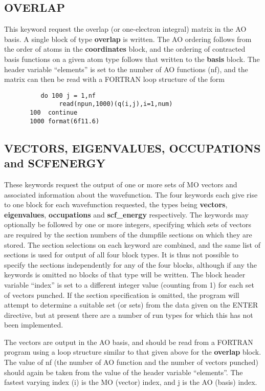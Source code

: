 \documentclass[11pt,fleqn]{article}
\begin{document}
\subsection[OVERLAP]{OVERLAP}

This keyword request the overlap (or one-electron integral) matrix
in the AO basis. A single block of type {\bf overlap} is written.
The AO ordering follows from the order of atoms in
the {\bf coordinates} block, and the ordering of contracted basis functions
on a given atom type follows that written to the {\bf basis} block.
The header variable ``elements'' is set to the number of AO functions (nf), and
the matrix can then be read with a FORTRAN loop structure of the form

{
\footnotesize
\begin{verbatim}
          do 100 j = 1,nf
               read(npun,1000)(q(i,j),i=1,num)
       100  continue
       1000 format(6f11.6)
\end{verbatim}
}

\subsection[VECTORS, EIGENVALUES, OCCUPATIONS and SCFENERGY]{VECTORS, EIGENVALUES, OCCUPATIONS and SCFENERGY}

These keywords request the output of one or more sets of MO vectors and associated 
information about the wavefunction. The four keywords each give rise to one block for each
wavefunction requested, the types being {\bf vectors}, {\bf eigenvalues}, {\bf occupations}
and {\bf scf\_energy} respectively. 
The keywords may optionally be followed by one or more integers, specifying
which sets of vectors are required by the section numbers of the
dumpfile sections on which they are stored. The section selections on each keyword are combined, and
the same list of sections is used for output of all four block types. It is thus not 
possible to specify the sections independently for any of the four blocks, although if any the keywords is
omitted no blocks of that type will be written. The block header variable ``index'' is set to a different
integer value (counting from 1) for each set of vectors punched. 
If the section specification is omitted,
the program will attempt to determine a suitable set (or sets) from the data given on
the ENTER directive, but at present there are a number of run types for which this has not been implemented.

The vectors are output in the AO basis, and should be read from a FORTRAN program using
a loop structure similar to that given above for the {\bf overlap} block. The value of nf 
(the number of AO function and the number of vectors punched) should again be taken 
from the value of the header variable ``elements''. The fastest varying index (i) is the 
MO (vector) index, and j is the AO (basis) index.
\end{document}
